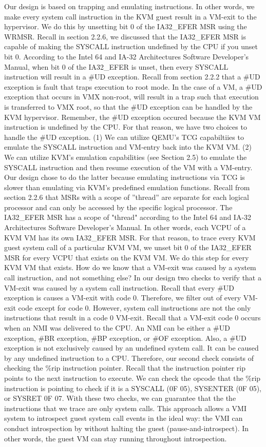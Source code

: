 \documentclass{report}
\begin{document}
\begin{spacing}{1.5}
{\large
Our design is based on trapping and emulating instructions. In other words, we make every system call instruction in the KVM guest result in a VM-exit to the hypervisor. We do this by unsetting bit 0 of the IA32\_EFER MSR using the WRMSR. Recall in section 2.2.6, we discussed that the IA32\_EFER MSR is capable of making the SYSCALL instruction undefined by the CPU if you unset bit 0. According to the Intel 64 and IA-32 Architectures Software Developer’s Manual, when bit 0 of the IA32\_EFER is unset, then every SYSCALL instruction will result in a \#UD exception. Recall from section 2.2.2 that a \#UD exception is fault that traps execution to root mode. In the case of a VM, a \#UD exception that occurs in VMX non-root, will result in a trap such that execution is transferred to VMX root, so that the \#UD exception can be handled by the KVM hypervisor. Remember, the \#UD exception occured because the KVM VM instruction is undefined by the CPU. For that reason, we have two choices to handle the \#UD exception. (1) We can utilize QEMU's TCG capabiltiies to emulate the SYSCALL instruction and VM-entry back into the KVM VM. (2) We can utilize KVM's emulation capabilities (see Section 2.5) to emulate the SYSCALL instruction and then resume execution of the VM with a VM-entry. Our design chose to do the latter because emulating instructions via TCG is slower than emulating via KVM's predefined emulation functions. Recall from section 2.2.6 that MSRs with a scope of ”thread” are separate for each logical processor and can only be accessed by the specific logical processor. The IA32\_EFER MSR has a scope of "thread" according to the Intel 64 and IA-32 Architectures Software Developer’s Manual. In other words, each VCPU of a KVM VM has its own IA32\_EFER MSR. For that reason, to trace every KVM guest system call of a particular KVM VM, we unset bit 0 of the IA32\_EFER MSR for every VCPU that exists on the KVM VM. We do this step for every KVM VM that exists. How do we know that a VM-exit was caused by a system call instruction, and not something else? In our design two checks to verify that a VM-exit was caused by a system call instruction. Recall that every \#UD exception is causes a VM-exit with code 0. Therefore, we filter out of every VM-exit code except for code 0. However, system call instructions are not the only instructions that result in a code 0 VM-exit. Recall that a VM-exit code 0 occurs when an NMI was delivered to the CPU. An NMI can be either a \#UD exception, \#BR exception, \#BP exception, or \#OF exception. Also, a \#UD exception is not exclusively caused by an undefined system call. It can be caused by any undefined instruction to a CPU. Therefore, our second check consists of checking the \%rip instruction pointer. Recall that the instruction pointer rip points to the next instruction to execute. We can check the opcode that the \%rip instruction is pointing to check if it is a SYSCALL (0F 05), SYSENTER (0F 05), or SYSRET 0F 07. With these two checks, we can guarantee that the the instructions that we trace are only system calls. This approach allows a VMI system to introspect guest system call events in the ideal way: the VMI can conduct introspection by without halting the guest (pause-and-introspect). In other words, the guest VM can stay running throughout introspection.
}
\end{spacing}
\end{document}
